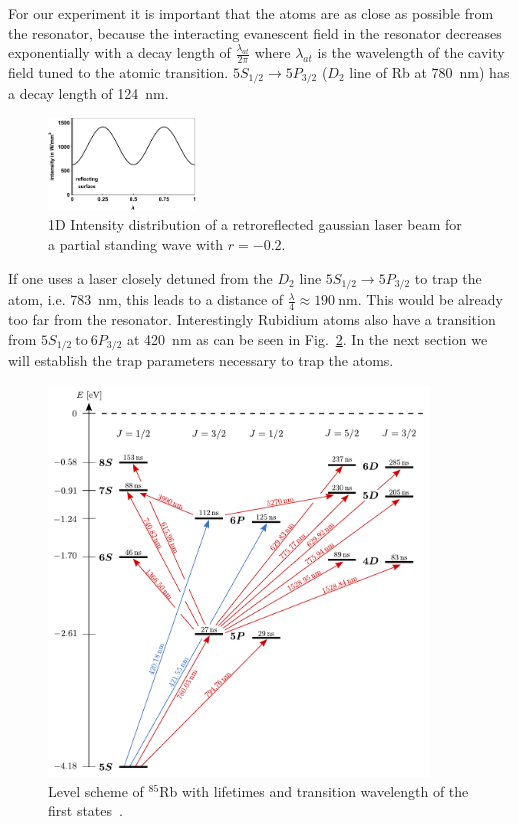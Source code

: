 For our experiment it is important that the atoms are as close as possible from 
the resonator, because the interacting evanescent field in the 
resonator decreases exponentially with a decay length of \(\frac{\lambda_{at} }{2\pi} \) 
where \(\lambda_{at} \) is the wavelength of the cavity field tuned to the atomic 
transition. \(5S_{1/2} \rightarrow 5P_{3/2} \) (\(D_2 \) line of Rb at 
\SI{780}{\nano\meter}) has a decay length of \SI{124}{\nano\meter}.

\begin{figure}
    \centering
    \includegraphics[width=0.35\textwidth]{intensityplot}    
    \caption{\label{fig:intensityplot} 1D Intensity distribution of a retroreflected 
    gaussian laser beam for a partial standing wave with \(r=-0.2\).}
\end{figure}
If one uses a laser closely detuned from 
the \(D_2 \) line \(5S_{1/2} \rightarrow 5P_{3/2} \) to trap the atom, i.e. 
\SI{783}{\nano\meter}, this leads to a distance of \(\frac{\lambda}{4} \approx 
\SI{190}{\nano\meter} \). This would be already too far from the resonator. 
Interestingly Rubidium atoms also have a transition from \(5S_{1/2}~\text{to}~6P_{3/2} \) 
at \SI{420}{\nano\meter} as can be seen in Fig.~\ref{fig:levelscheme}.
In the next section we will establish the trap parameters necessary to trap the
atoms.
\pagebreak

\begin{figure}[h]
    \centering
    \includegraphics[width=0.9\textwidth]{levelscheme}
    \caption{\label{fig:levelscheme} Level scheme of \(^{85}\)Rb with lifetimes
    and transition wavelength of the first states~\cite{SchulzPHD}.}
\end{figure}

